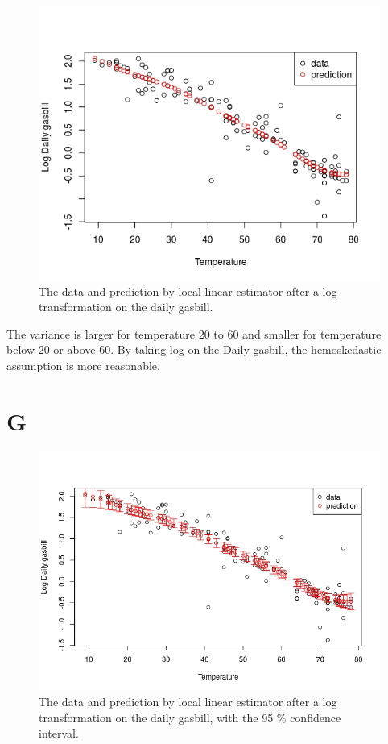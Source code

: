 \documentclass{article}
\begin{document}
\begin{figure}
\includegraphics[width=\textwidth]{util_log.jpeg}
\caption{The data and prediction by local linear estimator after a log transformation on the daily gasbill.}
\label{fig:util_log}
\end{figure}

The variance is larger for temperature 20 to 60 and smaller for temperature below 20 or above 60. By taking log on the Daily gasbill, the hemoskedastic assumption is more reasonable.

\section*{G}

\begin{figure}
\includegraphics[width=\textwidth]{util_ci.jpeg}
\caption{The data and prediction by local linear estimator after a log transformation on the daily gasbill, with the 95 \% confidence interval.}
\label{fig:util_log}
\end{figure}
\end{document}

